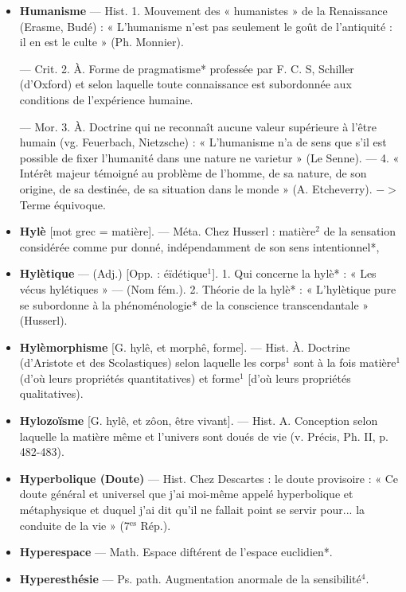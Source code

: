 \begin{itemize}[leftmargin=1cm, label=, itemsep=1pt]
\item {\bf Humanisme} — Hist. 1. Mouvement
des « humanistes » de la Renaissance (Erasme, Budé) : « L’humanisme n’est pas seulement le goût
de l’antiquité : il en est le culte »
(Ph. Monnier).

— Crit. 2. À. Forme de pragmatisme* professée par F. C. S, Schiller
(d'Oxford) et selon laquelle toute
connaissance est subordonnée aux
conditions de l'expérience humaine.

— Mor. 3. À. Doctrine qui ne
reconnaît aucune valeur supérieure
à l'être humain (vg. Feuerbach,
Nietzsche) : « L’humanisme n’a de
sens que s’il est possible de fixer
l'humanité dans une nature ne
varietur » (Le Senne). — 4. « Intérêt
majeur témoigné au problème de
l’homme, de sa nature, de son origine, de sa destinée, de sa situation
dans le monde » (A. Etcheverry).
$->$ Terme équivoque.

\item {\bf Hylè} [mot grec = matière]. — Méta.
Chez Husserl : matière$^2$ de la sensation considérée comme pur donné,
indépendamment de son sens intentionnel*,

\item {\bf Hylètique} — (Adj.) [Opp. : éïdétique$^1$].
1. Qui concerne la hylè* : « Les vécus
hylétiques » — (Nom fém.). 2.
Théorie de la hylè* : « L’hylètique
pure se subordonne à la phénoménologie* de la conscience transcendantale » (Husserl).

\item {\bf Hylèmorphisme} [G. hylê, et morphê,
forme]. — Hist. À. Doctrine (d'Aristote et des Scolastiques) selon laquelle les corps$^1$ sont à la fois matière$^1$ (d’où leurs propriétés quantitatives) et forme$^1$ [d’où leurs propriétés qualitatives).

\item {\bf Hylozoïsme} [G. hylê, et zôon, être
vivant]. — Hist. A. Conception
selon laquelle la matière même et
l'univers sont doués de vie (v. Précis,
Ph. II, p. 482-483).

\item {\bf Hyperbolique (Doute)} — Hist. Chez
Descartes : le doute provisoire : « Ce
doute général et universel que j'ai
moi-même appelé hyperbolique et
métaphysique et duquel j'ai dit
qu'il ne fallait point se servir pour...
la conduite de la vie » (7$^\text{es}$ Rép.).

\item {\bf Hyperespace} — Math. Espace diftérent de l’espace euclidien*.

\item {\bf Hyperesthésie} — Ps. path. Augmentation anormale de la sensibilité$^4$.


\end{itemize}
